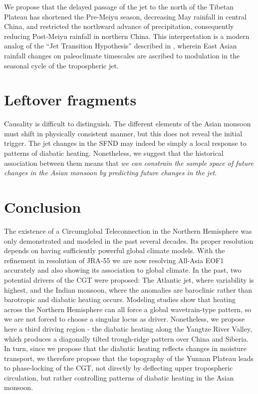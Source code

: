 	 	 
	We propose that the delayed passage of the jet to the north of the Tibetan Plateau has shortened the Pre-Meiyu season, decreasing May rainfall in central China, and restricted the northward advance of precipitation, consequently reducing Post-Meiyu rainfall in northern China. This interpretation is a modern analog of the ``Jet Transition Hypothesis'' described in \citet{Chiang2015}, wherein East Asian rainfall changes on paleoclimate timescales are ascribed to modulation in the seasonal cycle of the tropospheric jet. 	
 		 
\section{Leftover fragments}
	Causality is difficult to distinguish. The different elements of the Asian monsoon must shift in physically consistent manner, but this does not reveal the initial trigger. The jet changes in the SFND may indeed be simply a local response to patterns of diabatic heating. Nonetheless, we suggest that the historical association between them means that \textit{we can constrain the sample space of future changes in the Asian monsoon by predicting future changes in the jet}.
		 
\section{Conclusion}

	The existence of a Circumglobal Teleconnection in the Northern Hemisphere was only demonstrated and modeled in the past several decades. Its proper resolution depends on having sufficiently powerful global climate models. With the refinement in resolution of JRA-55 we are now resolving All-Asia EOF1 accurately and also showing its association to global climate. In the past, two potential drivers of the CGT were proposed: The Atlantic jet, where variability is highest, and the Indian monsoon, where the anomalies are baroclinic rather than barotropic and diabatic heating occurs. Modeling studies show that heating across the Northern Hemisphere can all force a global wavetrain-type pattern, so we are not forced to choose a singular locus as driver. Nonetheless, we propose here a third driving region - the diabatic heating along the Yangtze River Valley, which produces a diagonally tilted trough-ridge pattern over China and Siberia. In turn, since we propose that the diabatic heating reflects changes in moisture transport, we therefore propose that the topography of the Yunnan Plateau leads to phase-locking of the CGT, not directly by deflecting upper tropospheric circulation, but rather controlling patterns of diabatic heating in the Asian monsoon.
	
